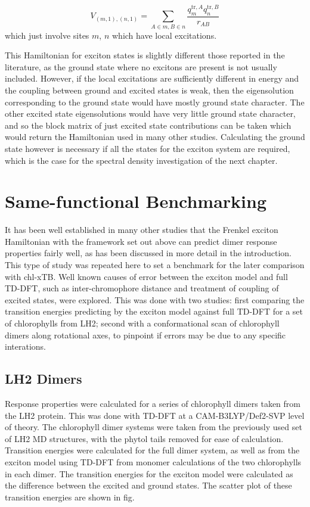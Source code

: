 \begin{equation}
    V_{\left(m, 1\right), \left(n,1\right)} = \sum_{A \in m, B \in n} \frac{q^{\text{tr},A}_m q^{\text{tr},B}_n}{r_{AB}}
\end{equation}
%
which just involve sites $m$, $n$ which have local excitations.

This Hamiltonian for exciton states is slightly different those reported in the 
literature, as the ground state where no excitons are present is not usually included.
However, if the local excitations are sufficiently different in energy and the coupling
between ground and excited states is weak, then the eigensolution corresponding 
to the ground state would have mostly ground state character. The other excited
state eigensolutions would have very little ground state character, and so the block
matrix of just excited state contributions can be taken which would return the Hamiltonian
used in many other studies. Calculating the ground state however is necessary if
all the states for the exciton system are required, which is the case for the
spectral density investigation of the next chapter.

\section{Same-functional Benchmarking}
\label{sec:exction_v_full_dimer}

It has been well established in many other studies that the Frenkel exciton Hamiltonian
with the framework set out above can predict dimer response properties fairly well,
as has been discussed in more detail in the introduction. This type of study was
repeated here to set a benchmark for the later comparison with chl-xTB. Well known
causes of error between the exciton model and full TD-DFT, such as inter-chromophore 
distance and treatment of coupling of excited states, were explored. This was done
with two studies: first comparing the transition energies predicting by the exciton 
model against full TD-DFT for a set of chlorophylls from LH2; second with a conformational
scan of chlorophyll dimers along rotational axes, to pinpoint if errors may be due
to any specific interations.

\subsection{LH2 Dimers}
\label{subsec:LH2_exciton_camb3lyp}

Response properties were calculated for a series of chlorophyll dimers taken from
the LH2 protein. This was done with TD-DFT at a CAM-B3LYP/Def2-SVP level of theory.
The chlorophyll dimer systems were taken from the previously used set of LH2 MD 
structures, with the phytol tails removed for ease of calculation. Transition energies
were calculated for the full dimer system, as well as from the exciton model using 
TD-DFT from monomer calculations of the two chlorophylls in each dimer. The transition
energies for the exciton model were calculated as the difference between the excited 
and ground states. The scatter plot of these transition energies are shown in fig. 

